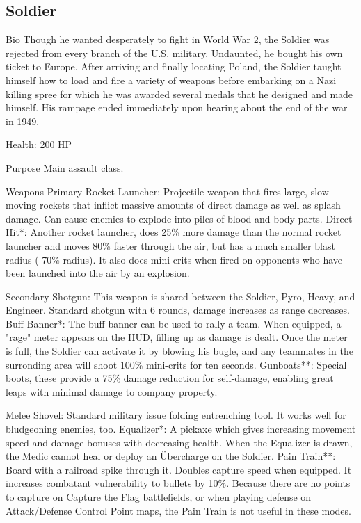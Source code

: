 \subsection{Soldier}
Bio
Though he wanted desperately to fight in World War 2, the Soldier was rejected from every branch of the U.S. military. Undaunted, he bought his own ticket to Europe. After arriving and finally locating Poland, the Soldier taught himself how to load and fire a variety of weapons before embarking on a Nazi killing spree for which he was awarded several medals that he designed and made himself. His rampage ended immediately upon hearing about the end of the war in 1949.

Health: 200 HP

Purpose
Main assault class.

Weapons
Primary
Rocket Launcher:  Projectile weapon that fires large, slow-moving rockets that inflict massive amounts of direct damage as well as splash damage. Can cause enemies to explode into piles of blood and body parts. 
Direct Hit*: Another rocket launcher, does 25\% more damage than the normal rocket launcher and moves 80\% faster through the air, but has a much smaller blast radius (-70\% radius). It also does mini-crits when fired on opponents who have been launched into the air by an explosion.

Secondary
Shotgun: This weapon is shared between the Soldier, Pyro, Heavy, and Engineer. Standard shotgun with 6 rounds, damage increases as range decreases. 
Buff Banner*: The buff banner can be used to rally a team.  When equipped, a "rage" meter appears on the HUD, filling up as damage is dealt.  Once the meter is full, the Soldier can activate it by blowing his bugle, and any teammates in the surronding area will shoot 100\% mini-crits for ten seconds.
Gunboats**: Special boots, these provide a 75\% damage reduction for self-damage, enabling great leaps with minimal damage to company property.

Melee
Shovel: Standard military issue folding entrenching tool. It works well for bludgeoning enemies, too. 
Equalizer*: A pickaxe which gives increasing movement speed and damage bonuses with decreasing health. When the Equalizer is drawn, the Medic cannot heal or deploy an Übercharge on the Soldier.
Pain Train**: Board with a railroad spike through it. Doubles capture speed when equipped.  It increases combatant vulnerability to bullets by 10\%. Because there are no points to capture on Capture the Flag battlefields, or when playing defense on Attack/Defense Control Point maps, the Pain Train is not useful in these modes.

